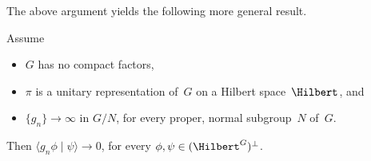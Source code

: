 


The above argument yields the following more general result.

\begin{cor}[(of proof)] \label{DecayMatCoeffNoCpct}
 Assume
 \begin{itemize}
 \item $G$ has no compact factors,
 \item $\pi$ is a unitary representation of~$G$
on a Hilbert space~$\Hilbert$, and
 \item $\{g_n\} \to \infty$ in $G/N$, for every proper,
normal subgroup~$N$ of~$G$.
 \end{itemize}
 Then $\langle g_n \phi \mid \psi \rangle \to 0$, for
every $\phi,\psi \in (\Hilbert^G)^\perp$.
 \end{cor}

